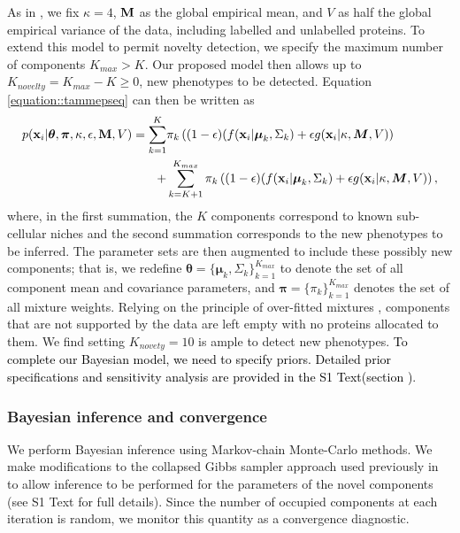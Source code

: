 \documentclass[12pt,english]{article}
\begin{document}
As in \cite{Crook:2018}, we fix $\kappa = 4$, ${\bf M}$ as the global empirical mean, and $V$
as half the global empirical variance of the data, including labelled and unlabelled proteins. To extend this model to permit novelty detection, we specify the maximum number of components $K_{max} > K$. Our proposed model then allows up to $K_{novelty} = K_{max} - K \geq 0$, new phenotypes to be detected. Equation \ref{equation::tammepseq} can then be written as 
\begin{equation}\label{equation::tammepseq2}
\begin{split}
p({\bf x}_i| \boldsymbol{\theta}, \boldsymbol{\pi} , \kappa, \epsilon, {\bf M}, V) =  \sum_{k=1}^{K}&\pi_k\left((1-\epsilon)(f({\bf x}_i |\boldsymbol{\mu}_k, \Sigma_k) + \epsilon g({\bf x}_i|\kappa, \boldsymbol{M}, V)\right)\\
+ & \sum_{k=K+1}^{K_{max}}\pi_k\left((1-\epsilon)(f({\bf x}_i |\boldsymbol{\mu}_k, \Sigma_k) + \epsilon g({\bf x}_i|\kappa, \boldsymbol{M}, V)\right),
\end{split}
\end{equation}
where, in the first summation, the $K$ components correspond to known sub-cellular niches and the second summation corresponds to the new phenotypes to be inferred. The parameter sets are then augmented to include these possibly new components; that is, we redefine 
$\boldsymbol{\theta} = \{\boldsymbol{\mu}_k, \Sigma_k \}_{k = 1}^{K_{max}}$
to denote the set of all component mean and covariance parameters, and
$\boldsymbol{\pi} = \{\pi_k\}_{k = 1}^{K_{max}}$ denotes the set of all mixture
weights. Relying on the principle of over-fitted mixtures \citep{Rousseau::2011}, components that are not supported by the data are left empty with no proteins allocated to them. We find setting $K_{novety} = 10$ is ample to detect new phenotypes. \textcolor{black}{To complete our Bayesian model, we need to specify priors. Detailed prior specifications and sensitivity analysis are provided in the S1 Text(section )}.   
\subsubsection*{Bayesian inference and convergence}
We perform Bayesian inference using Markov-chain Monte-Carlo methods. We make modifications to the collapsed Gibbs sampler approach used previously in \cite{Crook:2018} to allow inference to be performed for the parameters of the novel components (see S1 Text for full details). Since the number of occupied components at each iteration is random, we monitor this quantity as a convergence diagnostic.
\end{document}
